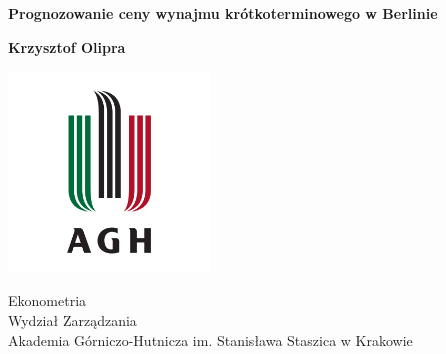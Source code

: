 \begin{titlepage}
    \begin{center}
        \vspace*{1cm}

        \LARGE
        \textbf{Prognozowanie ceny wynajmu krótkoterminowego w Berlinie}

        \vspace{1.5cm}

        \large
        \textbf{Krzysztof Olipra}

        \vfill
        \includegraphics[width=0.4\textwidth]{assets/agh.png}

        Ekonometria\\
        Wydział Zarządzania\\
        Akademia Górniczo-Hutnicza im. Stanisława Staszica w Krakowie\\

    \end{center}
\end{titlepage}
